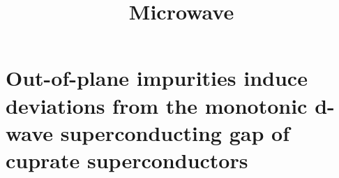 \documentclass[11pt]{article}
\title{Microwave}
\begin{document}
    
    
    \maketitle
    
    

    
    \hypertarget{out-of-plane-impurities-induce-deviations-from-the-monotonic-d-wave-superconducting-gap-of-cuprate-superconductors}{%
\section{Out-of-plane impurities induce deviations from the monotonic
d-wave superconducting gap of cuprate
superconductors}\label{out-of-plane-impurities-induce-deviations-from-the-monotonic-d-wave-superconducting-gap-of-cuprate-superconductors}}
\end{document}
